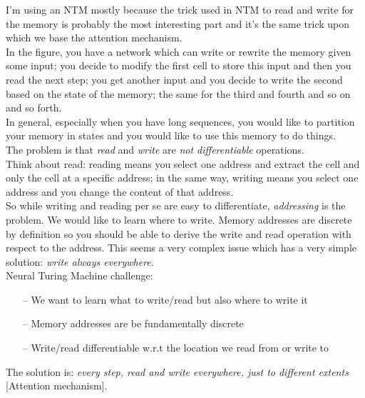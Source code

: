 I’m using an NTM mostly because the trick used in NTM to read and write for the memory is probably the most interesting part and it’s the same trick upon which we base the attention mechanism. \\
In the figure, you have a network which can write or rewrite the memory given some input; you decide to modify the first cell to store this input and then you read the next step; you get another input and you decide to write the second based on the state of the memory; the same for the third and fourth and so on and so forth. \\
In general, especially when you have long sequences, you would like to partition your memory in states and you would like to use this memory to do things.\\
The problem is that \textit{read} and \textit{write} are \textit{not differentiable} operations.\\
Think about read: reading  means you select one address and extract the cell and only the cell at a specific address; in the same way, writing means you select one address and you change the content of that address.\\
So while writing and reading per se are easy to differentiate, \textit{addressing} is the problem. We would like to learn where to write. Memory addresses are discrete by definition so you should be able to derive
the write and read operation with respect to the address. This
seems a very complex issue which has a very simple solution: \textit{write always everywhere}.\\

Neural Turing Machine challenge:
\begin{itemize}
    \item[--] We want to learn what to write/read but also where to write it
    \item[--] Memory addresses are be fundamentally discrete
    \item[--] Write/read differentiable w.r.t the location we read from or write to
\end{itemize}{}
The solution is: \textit{every step, read and write everywhere, just to different extents} [Attention mechanism]. \\ 

